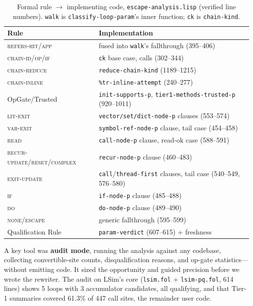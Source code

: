 \documentclass[sigplan,review,anonymous]{acmart}
\begin{document}
\begin{table}[h]
  \caption{Formal rule $\to$ implementing code, \texttt{escape-analysis.lisp} (verified line numbers). \texttt{walk} is \texttt{classify-loop-param}'s inner function; \texttt{ck} is \texttt{chain-kind}.}
  \label{tab:fidelity}
  \footnotesize
  \setlength{\tabcolsep}{2.5pt}
  \begin{tabular}{@{}ll@{}}
    \toprule
    Rule & Implementation \\
    \midrule
    \textsc{refers-hit/app} & fused into \texttt{walk}'s fallthrough (395--406) \\
    \textsc{chain-id/op/if} & \texttt{ck} base case, calls (302--344) \\
    \textsc{chain-reduce} & \texttt{reduce-chain-kind} (1189--1215) \\
    \textsc{chain-inline} & \texttt{\%tr-inline-attempt} (240--277) \\
    OpGate/Trusted & \texttt{init-supports-p}, \texttt{tier1-methods-trusted-p} (920--1011) \\
    \textsc{lit-exit} & \texttt{vector/set/dict-node-p} clauses (553--574) \\
    \textsc{var-exit} & \texttt{symbol-ref-node-p} clause, tail case (454--458) \\
    \textsc{read} & \texttt{call-node-p} clause, read-ok case (588--591) \\
    \textsc{recur-update/reset/complex} & \texttt{recur-node-p} clause (460--483) \\
    \textsc{exit-update} & \texttt{call}/\texttt{thread-first} clauses, tail case (540--549, 576--580) \\
    \textsc{if} & \texttt{if-node-p} clause (485--488) \\
    \textsc{do} & \texttt{do-node-p} clause (489--490) \\
    \textsc{none/escape} & generic fallthrough (595--599) \\
    Qualification Rule & \texttt{param-verdict} (607--615) + freshness \\
  \bottomrule
\end{tabular}
\end{table}

A key tool was \textbf{audit mode}, running the analysis against any codebase, collecting convertible-site counts, disqualification reasons, and op-gate statistics---without emitting code. It sized the opportunity and guided precision before we wrote the rewriter. The audit on LSim's core (\texttt{lsim.fol} + \texttt{lsim-pq.fol}, 614 lines) shows 5 loops with 3 accumulator candidates, all qualifying, and that Tier-1 summaries covered 61.3\% of 447 call sites, the remainder user code.
\end{document}
